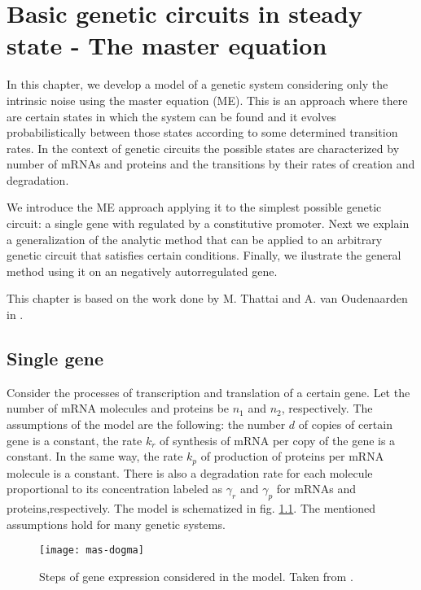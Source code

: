 \chapter{Basic genetic circuits in steady state - The master equation}
\label{ch:master}

In this chapter, we develop a model of a genetic system considering only the intrinsic noise using the master equation (ME). This is an approach where there are certain states in which the system can be found and it evolves probabilistically between those states according to some determined transition rates. In the context of genetic circuits the possible states are characterized by number of mRNAs and proteins and the transitions by their rates of creation and degradation.

We introduce the ME approach applying it to the simplest possible genetic circuit: a single gene with regulated by a constitutive promoter. Next we explain a generalization of the analytic method that can be applied to an arbitrary genetic circuit that satisfies certain conditions. Finally, we ilustrate the general method using it on an negatively autorregulated gene.


This chapter is based on the work done by M. Thattai and A. van Oudenaarden in \cite{thattai01}.

\section{Single gene}
\label{sec:mas-single_gene}
Consider the processes of transcription and translation of a certain gene. Let the number of mRNA molecules and proteins be $n_1$ and $n_2$, respectively. The assumptions of the model are the following: the number $d$ of copies of certain gene is a constant, the rate $k_r$ of synthesis of mRNA per copy of the gene is a constant. In the same way, the rate $k_p$ of production of proteins per mRNA molecule is a constant. There is also a degradation rate for each molecule proportional to its concentration labeled as $\gamma_r$ and $\gamma_p$ for mRNAs and proteins,respectively. The model is schematized in fig. \ref{fig:mas-dogma}. The mentioned assumptions hold for many genetic systems.


\begin{figure}[H]
  \centering
  \texttt{[image: mas-dogma]}
  \caption[Model of gene expression for a single gene]{\label{fig:mas-dogma} Steps of gene expression considered in the model. Taken from \cite{thattai01}.}
\end{figure}

